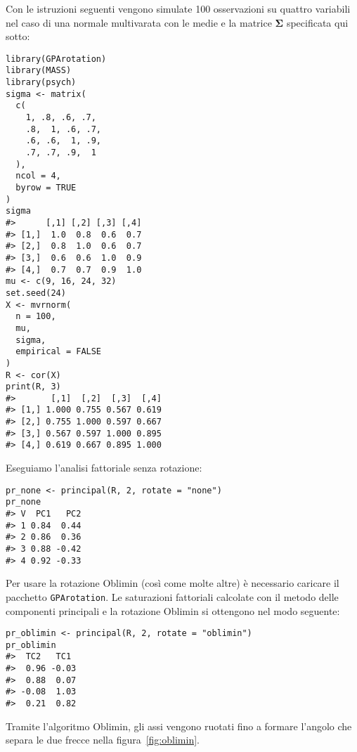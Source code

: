 \begin{exmp}
Con le istruzioni seguenti vengono simulate 100 osservazioni su quattro variabili nel caso di una normale multivarata con le medie e la matrice $\boldsymbol{\Sigma}$ specificata qui sotto:
\begin{lstlisting}
library(GPArotation)
library(MASS)
library(psych)
sigma <- matrix(
  c(
    1, .8, .6, .7,
    .8,  1, .6, .7,
    .6, .6,  1, .9,
    .7, .7, .9,  1
  ), 
  ncol = 4, 
  byrow = TRUE
)
sigma
#>      [,1] [,2] [,3] [,4]
#> [1,]  1.0  0.8  0.6  0.7
#> [2,]  0.8  1.0  0.6  0.7
#> [3,]  0.6  0.6  1.0  0.9
#> [4,]  0.7  0.7  0.9  1.0
mu <- c(9, 16, 24, 32)
set.seed(24) 
X <- mvrnorm(
  n = 100, 
  mu, 
  sigma, 
  empirical = FALSE
)
R <- cor(X)
print(R, 3)
#>       [,1]  [,2]  [,3]  [,4]
#> [1,] 1.000 0.755 0.567 0.619
#> [2,] 0.755 1.000 0.597 0.667
#> [3,] 0.567 0.597 1.000 0.895
#> [4,] 0.619 0.667 0.895 1.000
\end{lstlisting}
Eseguiamo  l'analisi fattoriale senza rotazione:
\begin{lstlisting}
pr_none <- principal(R, 2, rotate = "none")
pr_none
#> V  PC1   PC2
#> 1 0.84  0.44
#> 2 0.86  0.36
#> 3 0.88 -0.42
#> 4 0.92 -0.33
\end{lstlisting}
Per usare la rotazione Oblimin (così come molte altre) è necessario caricare il pacchetto \texttt{GPArotation}. Le saturazioni fattoriali calcolate con il metodo delle componenti principali e la rotazione Oblimin si ottengono nel modo seguente:
\begin{lstlisting}
pr_oblimin <- principal(R, 2, rotate = "oblimin")
pr_oblimin
#>  TC2   TC1   
#>  0.96 -0.03
#>  0.88  0.07 
#> -0.08  1.03 
#>  0.21  0.82 
\end{lstlisting}
Tramite l'algoritmo Oblimin, gli assi vengono ruotati fino a formare l'angolo che separa le due frecce nella figura~\ref{fig:oblimin}.  


\end{exmp}
